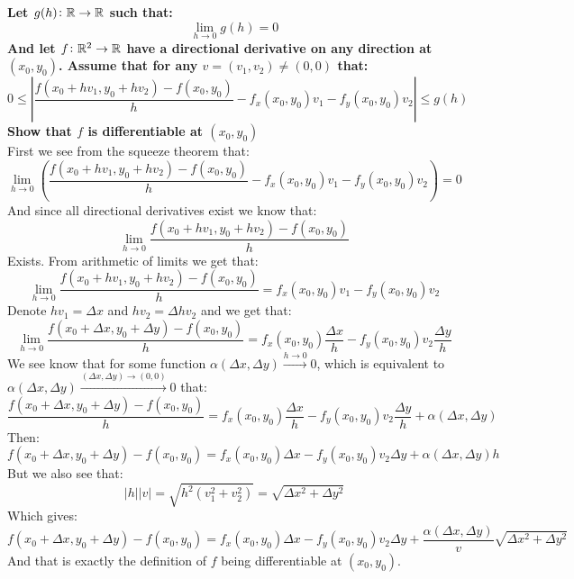 \documentclass[11pt,a4paper]{article}
\begin{document}
	\newpage
	
	\textbf{Let $g(h)\colon\mathbb{R}\to\mathbb{R}$ such that:
	\[
		\lim_{h\to0}{g(h)}=0
	\]
	And let $f\colon\mathbb{R}^2\to\mathbb{R}$ have a directional derivative on any direction at 
	$(x_0,y_0)$. Assume that for any $v=(v_1,v_2)\neq(0,0)$ that:
	\[
		0 \le \left\vert
		\frac{f(x_0+hv_1, y_0+hv_2) - f(x_0,y_0)}{h} - 
		f_x(x_0,y_0)v_1 - f_y(x_0,y_0)v_2 
		\right\vert
		\le g(h)
	\]
	Show that $f$ is differentiable at $(x_0,y_0)$} \\
	First we see from the squeeze theorem that:
	\[
		\lim_{h\to 0}\left(\frac{f(x_0+hv_1, y_0+hv_2) - f(x_0,y_0)}{h} - 
		f_x(x_0,y_0)v_1 - f_y(x_0,y_0)v_2\right) = 0
	\]
	And since all directional derivatives exist we know that:
	\[
		\lim_{h\to 0}\frac{f(x_0+hv_1, y_0+hv_2) - f(x_0,y_0)}{h}
	\]
	Exists. From arithmetic of limits we get that:
	\[
		\lim_{h\to 0}\frac{f(x_0+hv_1, y_0+hv_2) - f(x_0,y_0)}{h} = 
		f_x(x_0,y_0)v_1 - f_y(x_0,y_0)v_2
	\]
	Denote $hv_1 = \Delta x$ and $hv_2 = \Delta hv_2$ and we get that:
	\[
		\lim_{h\to 0}\frac{f(x_0+\Delta x, y_0+\Delta y) - f(x_0,y_0)}{h} = 
		f_x(x_0,y_0)\frac{\Delta x}{h} - f_y(x_0,y_0)v_2\frac{\Delta y}{h}
	\]
	We see know that for some function 
	$\alpha(\Delta x, \Delta y) \xrightarrow{h\to 0} 0$, which is equivalent to
	$\alpha(\Delta x, \Delta y) \xrightarrow{(\Delta x, \Delta y)\to (0,0)} 0$
	that:
	\[
		\frac{f(x_0+\Delta x, y_0+\Delta y) - f(x_0,y_0)}{h} = 
		f_x(x_0,y_0)\frac{\Delta x}{h} - f_y(x_0,y_0)v_2\frac{\Delta y}{h} + 
		\alpha(\Delta x, \Delta y)
	\]
	Then:
	\[
		f(x_0+\Delta x, y_0+\Delta y) - f(x_0,y_0) = 
		f_x(x_0,y_0){\Delta x} - f_y(x_0,y_0)v_2{\Delta y} + 
		\alpha(\Delta x, \Delta y)h
	\]
	But we also see that:
	\[
		|h||v| = \sqrt{h^2(v_1^2 + v_2^2)} = \sqrt{\Delta x^2 + \Delta y^2}
	\]
	Which gives:
	\[
		f(x_0+\Delta x, y_0+\Delta y) - f(x_0,y_0) = 
		f_x(x_0,y_0){\Delta x} - f_y(x_0,y_0)v_2{\Delta y} + 
		\frac{\alpha(\Delta x, \Delta y)}{v}\sqrt{\Delta x^2 + \Delta y^2}
	\]
	And that is exactly the definition of $f$ being differentiable at 
	$(x_0,y_0)$.
	
	\newpage
	
\end{document}
